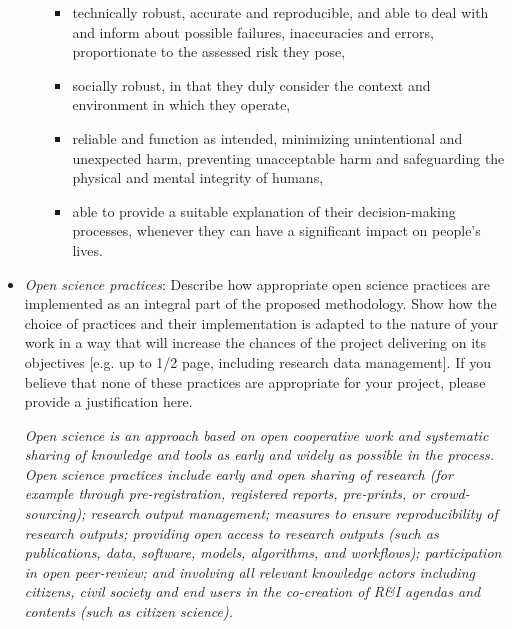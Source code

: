 \documentclass[11pt,draftproposal]{msca-pf}
\begin{document}
\begin{itemize}
\begin{itemize}
        \begin{itemize}
            \item technically robust, accurate and reproducible, and able to
            deal with and inform about possible failures, inaccuracies and
            errors, proportionate to the assessed risk they pose,

            \item socially robust, in that they duly consider the context and
            environment in which they operate,

            \item reliable and function as intended, minimizing unintentional
            and unexpected harm, preventing unacceptable harm and safeguarding
            the physical and mental integrity of humans,

            \item able to provide a suitable explanation of their decision-making
            processes, whenever they can have a significant impact on people’s
            lives.
        \end{itemize}
    \end{itemize}

    \item \emph{Open science practices}: Describe how appropriate open science
    practices are implemented as an integral part of the proposed methodology.
    Show how the choice of practices and their implementation is adapted to the
    nature of your work in a way that will increase the chances of the project
    delivering on its objectives [e.g. up to 1/2 page, including research data
    management]. If you believe that none of these practices are appropriate for
    your project, please provide a justification here.

    \emph{Open science is an approach based on open cooperative work and systematic
    sharing of knowledge and tools as early and widely as possible in the process.
    Open science practices include early and open sharing of research (for example
    through pre-registration, registered reports, pre-prints, or crowd-sourcing);
    research output management; measures to ensure reproducibility of research
    outputs; providing open access to research outputs (such as publications,
    data, software, models, algorithms, and workflows); participation in open
    peer-review; and involving all relevant knowledge actors including citizens,
    civil society and end users in the co-creation of R\&I agendas and contents
    (such as citizen science).}


\end{itemize}
\end{document}
